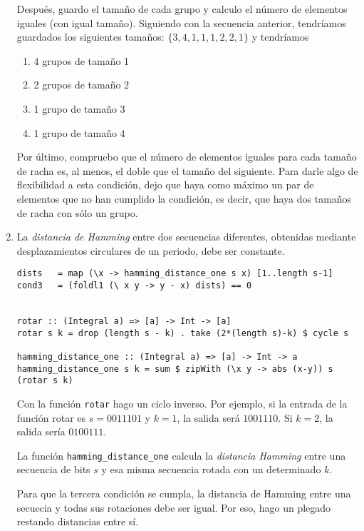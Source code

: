\documentclass[10pt,spanish]{article}
\begin{document}
\begin{enumerate}[1.]
Después, guardo el tamaño de cada grupo y calculo el número de elementos iguales (con igual tamaño). Siguiendo con la secuencia anterior, tendríamos guardados los siguientes tamaños: $\{3,4,1,1,1,2,2,1\}$ y tendríamos 

\begin{enumerate}[---]
    \item 4 grupos de tamaño 1
    \item 2 grupos de tamaño 2
    \item 1 grupo de tamaño 3
    \item 1 grupo de tamaño 4
\end{enumerate}

Por último, compruebo que el número de elementos iguales para cada tamaño de racha es, al menos, el doble que el tamaño del siguiente. Para darle algo de flexibilidad a esta condición, dejo que haya como máximo un par de elementos que no han cumplido la condición, es decir, que haya dos tamaños de racha con sólo un grupo.

\item La \textit{\textcolor{azul}{distancia de Hamming}} entre dos secuencias diferentes, obtenidas mediante desplazamientos circulares de un periodo, debe ser constante.

\begin{verbatim}
dists   = map (\x -> hamming_distance_one s x) [1..length s-1]
cond3   = (foldl1 (\ x y -> y - x) dists) == 0


rotar :: (Integral a) => [a] -> Int -> [a]
rotar s k = drop (length s - k) . take (2*(length s)-k) $ cycle s

hamming_distance_one :: (Integral a) => [a] -> Int -> a
hamming_distance_one s k = sum $ zipWith (\x y -> abs (x-y)) s (rotar s k)

\end{verbatim}

Con la función \texttt{rotar} hago un ciclo inverso. Por ejemplo, si la entrada de la función rotar es $s=0011101$ y $k=1$, la salida será $1001110$. Si $k=2$, la salida sería $0100111$.

La función \texttt{hamming\_distance\_one} calcula la \textit{\textcolor{azul}{distancia Hamming}} entre una secuencia de bits $s$ y esa misma secuencia rotada con un determinado $k$.

Para que la tercera condición se cumpla, la distancia de Hamming entre una secuecia y todas sus rotaciones debe ser igual. Por eso, hago un plegado restando distancias entre sí.
\end{enumerate}
\end{document}
